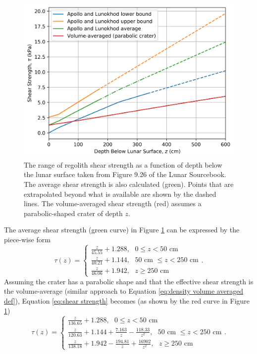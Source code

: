 \documentclass{article}
\begin{document}
\begin{figure}[!htb]
	\centering
	\includegraphics[width=\linewidth]{shear_strength_vs_depth.png}
	\caption{The range of regolith shear strength as a function of depth below the lunar surface taken from Figure 9.26 of the Lunar Sourcebook. The average shear strength is also calculated (green). Points that are extrapolated beyond what is available are shown by the dashed lines. The volume-averaged shear strength (red) assumes a parabolic-shaped crater of depth $z$.}
	\label{fig:shear_strength_vs_depth}
\end{figure}

The average shear strength (green curve) in Figure \ref{fig:shear_strength_vs_depth} can be expressed by the piece-wise form
\begin{equation}\label{eq:shear strength}
\tau(z) =
\begin{cases}
\frac{z}{45.55} + 1.288,\text{   $0 \le z < 50$ cm}\\
\frac{z}{40.21} + 1.144,\text{   $50$ cm $\le z < 250$ cm}\\
\frac{z}{46.06} + 1.942,\text{   $z \ge 250$ cm}
\end{cases}.
\end{equation}
Assuming the crater has a parabolic shape and that the effective shear strength is the volume-average (similar approach to Equation \eqref{eq:density volume averaged def}), Equation \eqref{eq:shear strength} becomes (as shown by the red curve in Figure \ref{fig:shear_strength_vs_depth})
\begin{equation}\label{eq:shear strength_avg_para}
\tau(z) =
\begin{cases}
\frac{z}{136.65} + 1.288,\text{   $0 \le z < 50$ cm}\\
\frac{z}{120.63} + 1.144 + \frac{7.163}{z} - \frac{118.33}{z^2},\text{   $50$ cm $\le z < 250$ cm}\\
\frac{z}{138.18} + 1.942 - \frac{194.81}{z} + \frac{16902}{z^2},\text{   $z \ge 250$ cm}
\end{cases}.
\end{equation}
\end{document}
